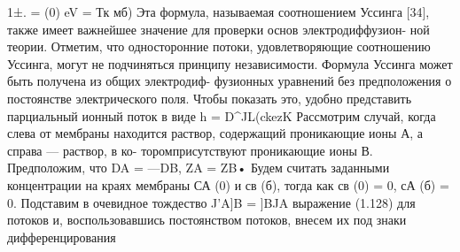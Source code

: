 1±. =	(0)	eV =
Тк мб)
Эта формула, называемая соотношением Уссинга [34], также имеет важнейшее значение для проверки основ электродиффузион- ной теории. Отметим, что односторонние потоки, удовлетворяющие соотношению Уссинга, могут не подчиняться принципу независимости.
Формула Уссинга может быть получена из общих электродиф- фузионных уравнений без предположения о постоянстве электрического поля. Чтобы показать это, удобно представить парциальный ионный поток в виде
h = D^JL(ckezK%
Рассмотрим случай, когда слева от мембраны находится раствор, содержащий проникающие ионы А, а справа — раствор, в ко- торомприсутствуют проникающие ионы В. Предположим, что DA = —DB, ZA = ZB• Будем считать заданными концентрации на краях мембраны СА (0) и св (б), тогда как св (0) = 0, сА (б) = 0. Подставим в очевидное тождество J'A]B = ]BJA выражение (1.128) для потоков
и, воспользовавшись постоянством потоков, внесем их под знаки дифференцирования
